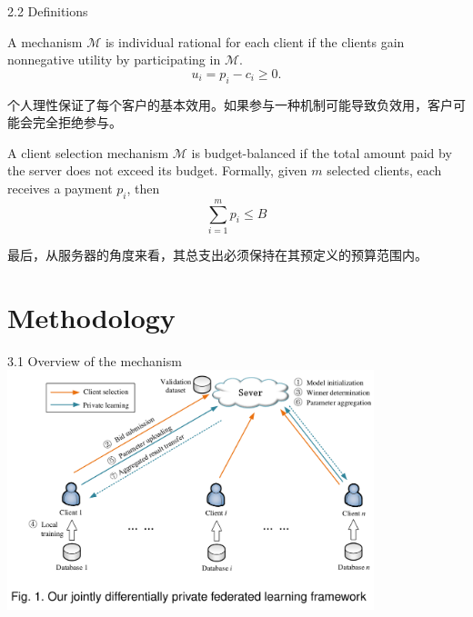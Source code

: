 \documentclass{sintefbeamer}
\theoremstyle{definition}
\begin{document}
\begin{frame}{2.2 Definitions}{\empty}
\begin{definition}
$\mathrm{A}$ mechanism $\mathcal{M}$ is individual rational for each client if the clients gain nonnegative utility by participating in $\mathcal{M}$.
$$
u_i=p_i-c_i \geq 0 .
$$
\end{definition}
个人理性保证了每个客户的基本效用。如果参与一种机制可能导致负效用，客户可能会完全拒绝参与。
\begin{definition} A client selection mechanism $\mathcal{M}$ is budget-balanced if the total amount paid by the server does not exceed its budget. Formally, given $m$ selected clients, each receives a payment $p_i$, then
$$
\sum_{i=1}^m p_i \leq B
$$
\end{definition}
最后，从服务器的角度来看，其总支出必须保持在其预定义的预算范围内。
\end{frame}


\section{Methodology}

\begin{frame}{3.1 Overview of the mechanism}{\empty}
\centering
\vspace{0.5em}\includegraphics[width=0.8\textwidth]{images/overview}
\end{frame}
\end{document}
